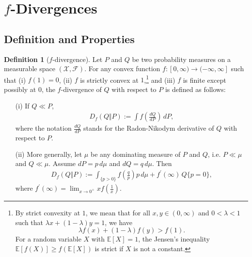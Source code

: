 \documentclass{article}
\numberwithin{equation}{section}
\newcommand{\E}{\mathbb{E}}
\theoremstyle{plain}
\theoremstyle{definition}
\newtheorem{definition}[theorem]{Definition}
\begin{document}
\newpage
\section{$f$-Divergences}
\subsection{Definition and Properties}
\begin{definition}[$f$-divergence]\label{fdivdef}
Let $P$ and $Q$ be two probability measures on a measurable space $(\mathcal{X},\mathscr{F})$. For any convex function $f:[0,\infty)\to(-\infty,\infty]$ such that (i) $f(1)=0$,  (ii) $f$ is strictly convex at $1$,\footnote{By strict convexity at $1$, we mean that for all $x,y\in(0,\infty)$ and $0<\lambda<1$ such that $\lambda x+(1-\lambda)y=1$, we have $$\lambda f(x)+(1-\lambda)f(y)>f(1).$$ For a random variable $X$ with $\E[X]=1$, the Jensen's inequality $\E[f(X)]\geq f(\E[X])$ is strict if $X$ is not a constant.} and (iii) $f$ is finite except possibly at 0,
the $f$-divergence of $Q$ with respect to $P$ is defined as follows:
\begin{itemize}
\item[(i)] If $Q\ll P$, 
	\begin{align*}
		D_f(Q\Vert P) := \int f\left(\frac{dQ}{dP}\right)\,dP,
	\end{align*}
where the notation $\frac{dQ}{dP}$ stands for the Radon-Nikodym derivative of $Q$ with respect to $P$.
\item[(ii)] More generally, let $\mu$ be any dominating measure of $P$ and $Q$, i.e. $P\ll\mu$ and $Q\ll\mu$. Assume $dP=p\,d\mu$ and $dQ=q\,d\mu$. Then
\begin{align}
	D_f(Q\Vert P) := \int_{\{p>0\}} f\left(\frac{q}{p}\right)p\,d\mu+f^\prime(\infty)\,Q\{p=0\},\label{generalfdiv}
\end{align}
where $f^\prime(\infty)=\lim_{x\to 0^+}xf(\frac{1}{x})$.
\end{itemize} 
\end{definition} 
\end{document}
